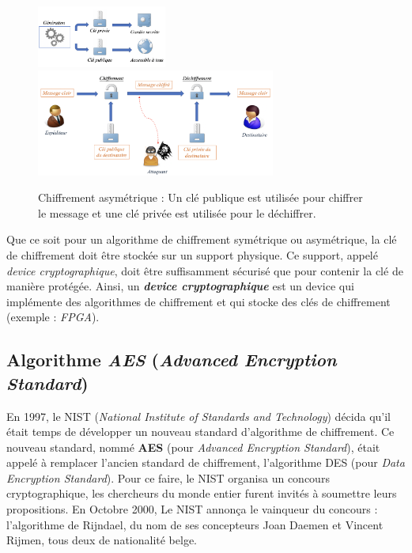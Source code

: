 \documentclass[10pt, oneside, a4paper]{article}
\begin{document}
\begin{figure}[htbp]
    \centering
    \includegraphics[width=0.38\textwidth]{image/cle_asymetrique}
    \includegraphics[width=0.7\textwidth]{image/asymetrique}
    \caption{Chiffrement asymétrique : Un clé publique est utilisée pour chiffrer le message et une clé privée est utilisée pour le déchiffrer.}
    \label{fig:asymétrique}
\end{figure}


Que ce soit pour un algorithme de chiffrement symétrique ou asymétrique, la clé de chiffrement doit être stockée sur un support physique. Ce support, appelé \textit{device cryptographique}, doit être suffisamment sécurisé que pour contenir la clé de manière protégée. Ainsi, un \textbf{\textit{device cryptographique}} est un device qui implémente des algorithmes de chiffrement et qui stocke des clés de chiffrement (exemple : \textit{FPGA}).

\subsection{Algorithme \textit{AES} (\textit{Advanced Encryption Standard})}
\label{sec:AES}

En 1997, le NIST (\textit{National Institute of Standards and Technology}) décida qu'il était temps de développer un nouveau standard d'algorithme de chiffrement. Ce nouveau standard, nommé \textbf{AES} (pour \textit{Advanced Encryption Standard}), était appelé à remplacer l'ancien standard de chiffrement, l'algorithme DES (pour \textit{Data Encryption Standard}). Pour ce faire, le NIST organisa un concours cryptographique, les chercheurs du monde entier furent invités à soumettre leurs propositions. En Octobre 2000, Le NIST annonça le vainqueur du concours : l'algorithme de Rijndael, du nom de ses concepteurs Joan Daemen et Vincent Rijmen, tous deux de nationalité belge.
\end{document}
